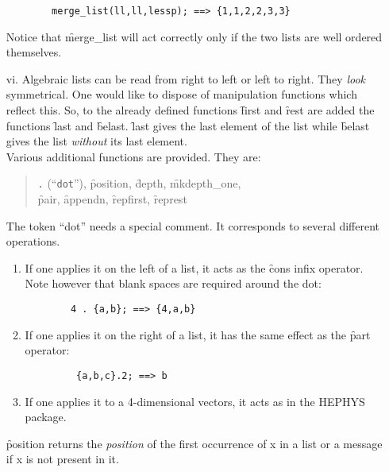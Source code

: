 \begin{itemize}
\begin{verbatim}
        merge_list(ll,ll,lessp); ==> {1,1,2,2,3,3}
\end{verbatim}
Notice that \f{merge\_list} will act correctly only if the two lists 
are well ordered themselves. 
\item[vi.]
Algebraic lists can be read from right to left or left to right.
They \emph{look} symmetrical. One would like to dispose of manipulation
functions which reflect this.
\hypertarget{operator:LAST}{}
\hypertarget{operator:BELAST}{}
So, to the already defined functions  \f{first} and \f{rest} are
added the functions \f{last}  and \f{belast}. \f{last} gives the last
element of the list while \f{belast} gives the list {\em without} its
last element. \\
Various additional functions are provided. They are:
\hypertarget{operator:POSITION}{}
\hypertarget{operator:DEPTH}{}
\hypertarget{operator:MKDEPTH_ONE}{}
\hypertarget{operator:PAIR}{}
\hypertarget{operator:APPENDN}{}
\hypertarget{operator:REPFIRST}{}
\hypertarget{operator:REPREST}{}
\begin{quote}
\texttt{.} (``\texttt{dot}''), \f{position}, \f{depth}, \f{mkdepth\_one}, \\
\f{pair}, \f{appendn}, \f{repfirst}, \f{represt}
\end{quote}
The token ``dot'' needs a special comment. It corresponds to
several different operations.
\begin{enumerate}
\item If one applies it on the left of a list, it acts as the \f{cons}
infix operator. Note however that blank spaces are required around the dot:
\begin{verbatim}
        4 . {a,b}; ==> {4,a,b}
\end{verbatim}
\item If one applies it on the right of a list, it has the same
effect as the \f{part} operator:
\begin{verbatim}
         {a,b,c}.2; ==> b
\end{verbatim}
\item If one applies it to  a 4-dimensional vectors, it acts as in the
HEPHYS package.
\end{enumerate}
\f{position} returns the \emph{position} of the first occurrence of x in
a list or a message if x is not present in it.


\end{itemize}
